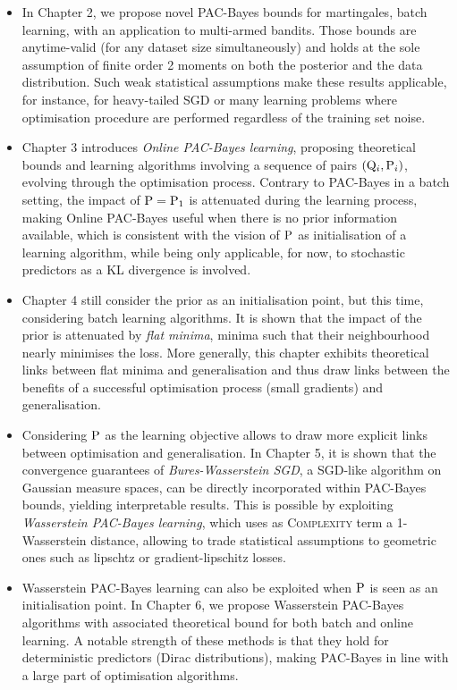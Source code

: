 \begin{itemize}
  \item In Chapter 2, we propose novel PAC-Bayes bounds for martingales, batch learning, with an application to multi-armed bandits. Those bounds are anytime-valid (\ie for any dataset size simultaneously) and holds at the sole assumption of finite order 2 moments on both the posterior and the data distribution. Such weak statistical assumptions make these results applicable, for instance, for heavy-tailed SGD or many learning problems where optimisation procedure are performed regardless of the training set noise.
  \item Chapter 3 introduces \emph{Online PAC-Bayes learning}, proposing theoretical bounds and learning algorithms involving a sequence of pairs $(\Q_i,\P_i)$, evolving through the optimisation process. Contrary to PAC-Bayes in a batch setting, the impact of $\P=\P_1$ is attenuated during the learning process, making Online PAC-Bayes useful when there is no prior information available, which is consistent with the vision of $\P$ as initialisation of a learning algorithm, while being only applicable, for now, to stochastic predictors as a KL divergence is involved.
  \item Chapter 4 still consider the prior as an initialisation point, but this time, considering batch learning algorithms. It is shown that the impact of the prior is attenuated by \emph{flat minima}, \ie minima such that their neighbourhood nearly minimises the loss. More generally, this chapter exhibits theoretical links between flat minima and generalisation and thus draw links between the benefits of a successful optimisation process (small gradients) and generalisation.
  \item Considering $\P$ as the learning objective allows to draw more explicit links between optimisation and generalisation. In Chapter 5, it is shown that the convergence guarantees of \emph{Bures-Wasserstein SGD}, a SGD-like algorithm on Gaussian measure spaces, can be directly incorporated within PAC-Bayes bounds, yielding interpretable results. This is possible by exploiting \emph{Wasserstein PAC-Bayes learning}, which uses as \textsc{Complexity} term a 1-Wasserstein distance, allowing to trade statistical assumptions to geometric ones such as lipschtz or gradient-lipschitz losses. 
  \item Wasserstein PAC-Bayes learning can also be exploited when $\P$ is seen as an initialisation point. In Chapter 6, we propose Wasserstein PAC-Bayes algorithms with associated theoretical bound for both batch and online learning. A notable strength of these methods is that they hold for deterministic predictors (Dirac distributions), making PAC-Bayes in line with a large part of optimisation algorithms.
\end{itemize}

